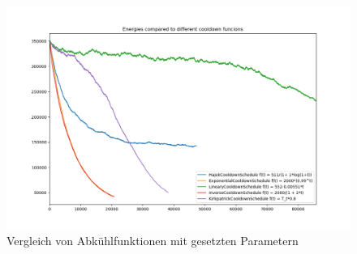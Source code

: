 \begin{figure}[H]\label{pic:Cool Down Comparisson}
    \centering
    \includegraphics[width=\linewidth]{content/simulatedAnnealing/Bilder/Energy_Cooldown_compared_steps_85771.png}
    \caption{Vergleich von Abkühlfunktionen mit gesetzten Parametern}
\end{figure}


